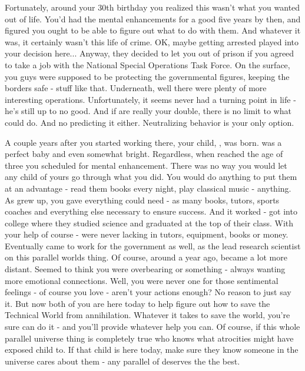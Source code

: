\documentclass[char]{guildcamp3}
\begin{document}
Fortunately, around your 30th birthday you realized this wasn't what you wanted out of life. You'd had the mental enhancements for a good five years by then, and figured you ought to be able to figure out what to do with them. And whatever it was, it certainly wasn't this life of crime. OK, maybe getting arrested played into your decision here... Anyway, they decided to let you out of prison if you agreed to take a job with the National Special Operations Task Force. On the surface, you guys were supposed to be protecting the governmental figures, keeping the borders safe - stuff like that. Underneath, well there were plenty of more interesting operations. Unfortunately, it seems \cRogueTwo{\formal} never had a turning point in \cRogueTwo{\their} life - he's still up to no good. And if  are really your double, there is no limit to what \cRogueTwo{\they} could do. And no predicting it either. Neutralizing \cRogueTwo{\their} behavior is your only option. 

A couple years after you started working there, your child, \cSciOne{\intro}, was born. \cSciOne{\they} was a perfect baby and even somewhat bright. Regardless, when \cSciOne{\they} reached the age of three you scheduled \cSciOne{\them} for mental enhancement. There was no way you would let any child of yours go through what you did. You would do anything to put them at an advantage - read them books every night, play classical music - anything. As \cSciOne{\informal} grew up, you gave \cSciOne{\them} everything \cSciOne{\they} could need - as many books, tutors, sports coaches and everything else necessary to ensure success. And it worked - \cSciOne{\informal} got into college where they studied science and graduated at the top of their class. With your help of course - \cSciOne{\they} were never lacking in tutors, equipment, books or money. Eventually \cSciOne{} came to work for the government as well, as the lead research scientist on this parallel worlds thing. Of course, around a year ago, \cSciOne{\they} became a lot more distant. Seemed to think you were overbearing or something - always wanting more emotional connections. Well, you were never one for those sentimental feelings - of course you love \cSciOne{\them} - aren't your actions enough? No reason to just say it. But now both of you are here today to help figure out how to save the Technical World from annihilation. Whatever it takes to save the world, you're sure \cSciOne{\informal} can do it - and you'll provide whatever help you can. Of course, if this whole parallel universe thing is completely true who knows what atrocities \cRogueTwo{} might have exposed  child to. If that child is here today, make sure they know someone in the universe cares about them - any parallel of \cSciOne{\informal} deserves the the best. 
\end{document}
